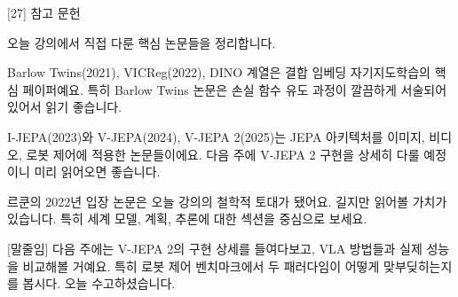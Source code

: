 \documentclass[aspectratio=169,10pt]{beamer}
\newenvironment{script}{%
  \footnotesize
  \setlength{\parskip}{0.5em}
  \setlength{\parindent}{0pt}
}{}
\begin{document}
\begin{frame}{[27] 참고 문헌}
\begin{script}
오늘 강의에서 직접 다룬 핵심 논문들을 정리합니다.

Barlow Twins(2021), VICReg(2022), DINO 계열은 결합 임베딩 자기지도학습의 핵심 페이퍼예요. 특히 Barlow Twins 논문은 손실 함수 유도 과정이 깔끔하게 서술되어 있어서 읽기 좋습니다.

I-JEPA(2023)와 V-JEPA(2024), V-JEPA 2(2025)는 JEPA 아키텍처를 이미지, 비디오, 로봇 제어에 적용한 논문들이에요. 다음 주에 V-JEPA 2 구현을 상세히 다룰 예정이니 미리 읽어오면 좋습니다.

르쿤의 2022년 입장 논문은 오늘 강의의 철학적 토대가 됐어요. 길지만 읽어볼 가치가 있습니다. 특히 세계 모델, 계획, 추론에 대한 섹션을 중심으로 보세요.

[말줄임] 다음 주에는 V-JEPA 2의 구현 상세를 들여다보고, VLA 방법들과 실제 성능을 비교해볼 거예요. 특히 로봇 제어 벤치마크에서 두 패러다임이 어떻게 맞부딪히는지를 봅시다. 오늘 수고하셨습니다.
\end{script}
\end{frame}
\end{document}
